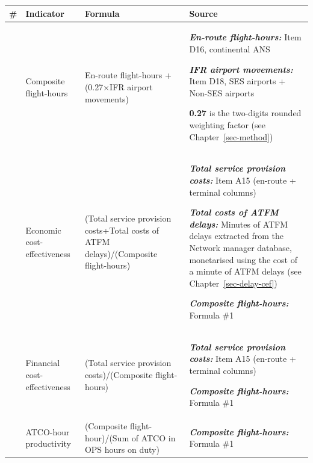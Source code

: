 \documentclass[
  11pt,
  a4paperpaper,
  openany,headsepline=on,footsepline=off,DIV=12,table]{scrbook}
\begin{document}
\begin{longtable}[]{@{}
  >{\raggedright\arraybackslash}p{}
  >{\raggedright\arraybackslash}p{}
  >{\raggedright\arraybackslash}p{}
  >{\raggedright\arraybackslash}p{}@{}}
\toprule\noalign{}
\begin{minipage}[b]{\linewidth}\raggedright
\#
\end{minipage} & \begin{minipage}[b]{\linewidth}\raggedright
Indicator
\end{minipage} & \begin{minipage}[b]{\linewidth}\raggedright
Formula
\end{minipage} & \begin{minipage}[b]{\linewidth}\raggedright
Source
\end{minipage} \\
\midrule\noalign{}
\endhead
\bottomrule\noalign{}
\endlastfoot
1 & Composite flight-hours & En-route flight-hours +(0.27×IFR airport
movements) & \textbf{\emph{En-route flight-hours:}} Item D16,
continental ANS

\textbf{\emph{IFR airport movements:}} Item D18, SES airports + Non-SES
airports

\textbf{0.27} is the two-digits rounded weighting factor (see
Chapter~\ref{sec-method}) \\
2 & Economic cost-effectiveness & (Total service provision costs+Total
costs of ATFM delays)/(Composite flight-hours) & \textbf{\emph{Total
service provision costs:}} Item A15 (en-route + terminal columns)

\textbf{\emph{Total costs of ATFM delays:}} Minutes of ATFM delays
extracted from the Network manager database, monetarised using the cost
of a minute of ATFM delays (see Chapter~\ref{sec-delay-cef})

\textbf{\emph{Composite flight-hours:}} Formula \#1 \\
3 & Financial cost-effectiveness & (Total service provision
costs)/(Composite flight-hours) & \textbf{\emph{Total service provision
costs:}} Item A15 (en-route + terminal columns)

\textbf{\emph{Composite flight-hours:}} Formula \#1 \\
4 & ATCO-hour productivity & (Composite flight-hour)/(Sum of ATCO in OPS
hours on duty) & \textbf{\emph{Composite flight-hours:}} Formula \#1


\end{longtable}
\end{document}
